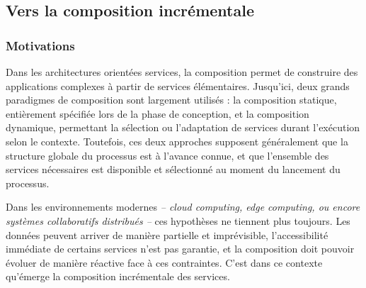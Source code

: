 \subsection{Vers la composition incrémentale}



\subsubsection{Motivations}
Dans les architectures orientées services, la composition permet de construire des applications complexes à partir de services élémentaires. Jusqu’ici, deux grands paradigmes de composition sont largement utilisés : la composition statique, entièrement spécifiée lors de la phase de conception, et la composition dynamique, permettant la sélection ou l'adaptation de services durant l'exécution selon le contexte. Toutefois, ces deux approches supposent généralement que la structure globale du processus est à l’avance connue, et que l’ensemble des services nécessaires est disponible et sélectionné au moment du lancement du processus.

Dans les environnements modernes \textit{– cloud computing, edge computing, ou encore systèmes collaboratifs distribués –} ces hypothèses ne tiennent plus toujours. Les données peuvent arriver de manière partielle et imprévisible, l'accessibilité immédiate de certains services n'est pas garantie, et la composition doit pouvoir évoluer de manière réactive face à ces contraintes. C’est dans ce contexte qu’émerge la composition incrémentale des services.

